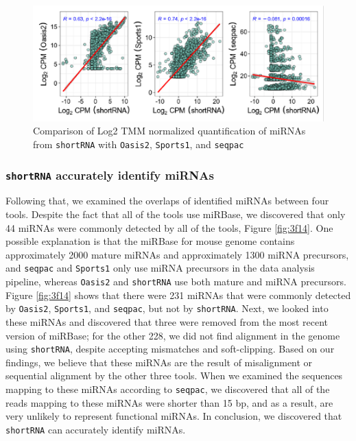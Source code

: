 \documentclass[12pt,twoside]{reedthesis}
\begin{document}
\begin{figure}[htbp]

{\centering \includegraphics{thesis_files/figure-latex/3f13-1} 

}

\caption{Comparison of Log2 TMM normalized quantification of miRNAs from \texttt{shortRNA} with \texttt{Oasis2}, \texttt{Sports1}, and \texttt{seqpac}}\label{fig:3f13}
\end{figure}
\hypertarget{shortrna-accurately-identify-mirnas}{%
\subsubsection{\texorpdfstring{\texttt{shortRNA} accurately identify miRNAs}{shortRNA accurately identify miRNAs}}\label{shortrna-accurately-identify-mirnas}}

Following that, we examined the overlaps of identified miRNAs between
four tools. Despite the fact that all of the tools use miRBase, we
discovered that only 44 miRNAs were commonly detected by all of the
tools, Figure \ref{fig:3f14}. One possible explanation is that the miRBase for
mouse genome contains approximately 2000 mature miRNAs and approximately
1300 miRNA precursors, and \texttt{seqpac} and \texttt{Sports1} only use miRNA precursors
in the data analysis pipeline, whereas \texttt{Oasis2} and \texttt{shortRNA} use both
mature and miRNA precursors. Figure \ref{fig:3f14} shows that there were 231 miRNAs
that were commonly detected by \texttt{Oasis2}, \texttt{Sports1}, and \texttt{seqpac}, but not by
\texttt{shortRNA}. Next, we looked into these miRNAs and discovered that three
were removed from the most recent version of miRBase; for the other 228,
we did not find alignment in the genome using \texttt{shortRNA}, despite
accepting mismatches and soft-clipping. Based on our findings, we
believe that these miRNAs are the result of misalignment or sequential
alignment by the other three tools. When we examined the sequences
mapping to these miRNAs according to \texttt{seqpac}, we discovered that all of
the reads mapping to these miRNAs were shorter than 15 bp, and as a
result, are very unlikely to represent functional miRNAs. In conclusion,
we discovered that \texttt{shortRNA} can accurately identify miRNAs.
\end{document}
